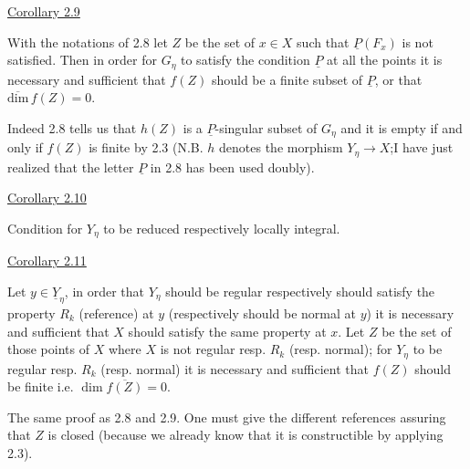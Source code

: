 
\uline{Corollary 2.9}

With the notations of 2.8 let $Z$ be the set of $x \in X$ such that
$\underline{P}(F_x)$ is not satisfied. Then in order for $G_\eta$ to satisfy the
condition $\underline{P}$ at all the points it is necessary and sufficient that
$f(Z)$ should be a finite subset of $\underline{P}$, or that $\overline{\mathrm{dim}}\, f(Z) = 0$.

Indeed 2.8 tells us that $h(Z)$ is a $\underline{P}$-singular subset of $G_\eta$ and
it is empty if and only if $f(Z)$ is finite by 2.3 (N.B. $h$ denotes
the morphism $Y_\eta \to X$;I have just realized that the letter $\underline{P}$ in 2.8
has been used doubly).

\uline{Corollary 2.10}

Condition for $Y_\eta$ to be reduced respectively locally integral.

\uline{Corollary 2.11}

Let $y \in \underline{Y}_\eta$, in order that $Y_\eta$ should be regular respectively
should satisfy the property $R_k$ (reference) at $y$ (respectively
should be normal at $y$) it is necessary and sufficient that $X$
should satisfy the same property at $x$. Let $Z$ be the set of those
points of $X$ where $X$ is not regular resp. $R_k$ (resp. normal); for $Y_\eta$
to be regular resp. $R_k$ (resp. normal) it is necessary and
sufficient that $f(Z)$ should be finite i.e. $\dim \overline{f(Z)} = 0$.

The same proof as 2.8 and 2.9. One must give the different
references assuring that $Z$ is closed (because we already know that
it is constructible by applying 2.3).
